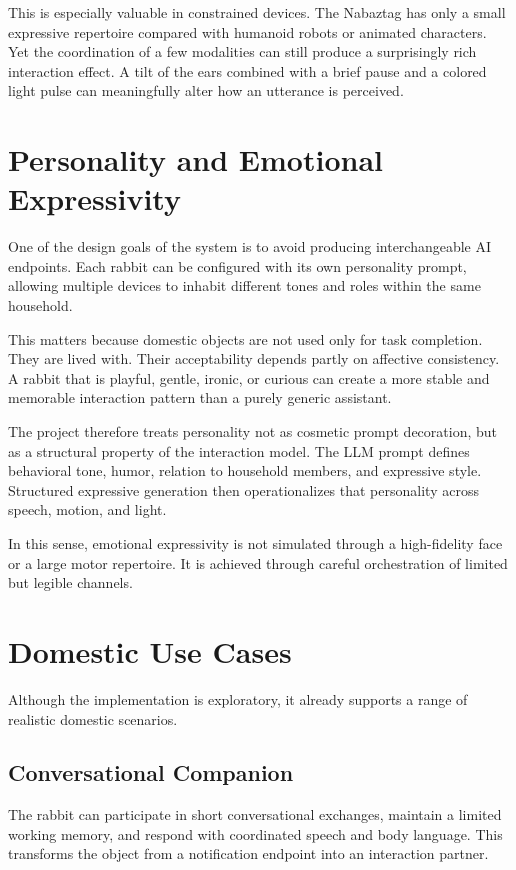 \documentclass[11pt]{article}
\begin{document}
This is especially valuable in constrained devices. The Nabaztag has only a small expressive repertoire compared with humanoid robots or animated characters. Yet the coordination of a few modalities can still produce a surprisingly rich interaction effect. A tilt of the ears combined with a brief pause and a colored light pulse can meaningfully alter how an utterance is perceived.

\section{Personality and Emotional Expressivity}

One of the design goals of the system is to avoid producing interchangeable AI endpoints. Each rabbit can be configured with its own personality prompt, allowing multiple devices to inhabit different tones and roles within the same household.

This matters because domestic objects are not used only for task completion. They are lived with. Their acceptability depends partly on affective consistency. A rabbit that is playful, gentle, ironic, or curious can create a more stable and memorable interaction pattern than a purely generic assistant.

The project therefore treats personality not as cosmetic prompt decoration, but as a structural property of the interaction model. The LLM prompt defines behavioral tone, humor, relation to household members, and expressive style. Structured expressive generation then operationalizes that personality across speech, motion, and light.

In this sense, emotional expressivity is not simulated through a high-fidelity face or a large motor repertoire. It is achieved through careful orchestration of limited but legible channels.

\section{Domestic Use Cases}

Although the implementation is exploratory, it already supports a range of realistic domestic scenarios.

\subsection{Conversational Companion}

The rabbit can participate in short conversational exchanges, maintain a limited working memory, and respond with coordinated speech and body language. This transforms the object from a notification endpoint into an interaction partner.
\end{document}
